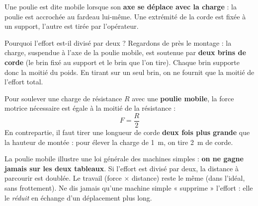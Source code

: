 \documentclass[11pt]{article}
\newcommand{\cle}[1]{{\popxbold\color{popdark}#1}}
\newcounter{popsec}
\newcounter{popsub}
\newcommand{\courssub}[1]{%
  \stepcounter{popsub}%
  \par\vspace{9pt}\noindent{\popxbold\fontsize{11.5}{13}\selectfont\color{popink}{\color{poporange}\thepopsec.\thepopsub}\hspace{6pt}#1}\par\nopagebreak\vspace{4pt}
}
\begin{document}
\courssub{La poulie mobile}

\begin{definition}
Une poulie est dite \cle{mobile} lorsque son \textbf{axe se déplace avec la charge} : la poulie est accrochée au fardeau lui-même. Une extrémité de la corde est fixée à un support, l'autre est tirée par l'opérateur.
\end{definition}

Pourquoi l'effort est-il divisé par deux ? Regardons de près le montage : la charge, suspendue à l'axe de la poulie mobile, est soutenue par \textbf{deux brins de corde} (le brin fixé au support et le brin que l'on tire). Chaque brin supporte donc la moitié du poids. En tirant sur un seul brin, on ne fournit que la moitié de l'effort total.

\begin{propriete}
Pour soulever une charge de résistance $R$ avec une \textbf{poulie mobile}, la force motrice nécessaire est égale à la moitié de la résistance :
\[ F = \dfrac{R}{2} \]
En contrepartie, il faut tirer une longueur de corde \textbf{deux fois plus grande} que la hauteur de montée : pour élever la charge de \SI{1}{m}, on tire \SI{2}{m} de corde.
\end{propriete}

\begin{attention}
La poulie mobile illustre une loi générale des machines simples : \textbf{on ne gagne jamais sur les deux tableaux}. Si l'effort est divisé par deux, la distance à parcourir est doublée. Le travail (force $\times$ distance) reste le même (dans l'idéal, sans frottement). Ne dis jamais qu'une machine simple « supprime » l'effort : elle le \emph{réduit} en échange d'un déplacement plus long.
\end{attention}
\end{document}
